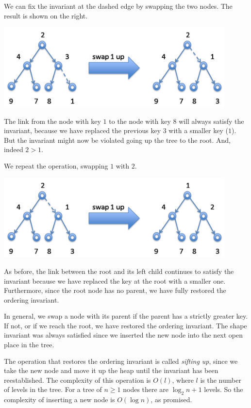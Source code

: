 We can fix the invariant at the dashed edge by swapping the two
nodes.  The result is shown on the right.
\begin{center}
  \includegraphics[width=0.9\textwidth]{img/swap1up-a.png}
\end{center}
The link from the node with key $1$ to the node with key $8$ will
always satisfy the invariant, because we have replaced the previous
key $3$ with a smaller key ($1$).  But the invariant might now be
violated going up the tree to the root.  And, indeed $2 > 1$.

We repeat the operation, swapping $1$ with $2$.
\begin{center}
  \includegraphics[width=0.9\textwidth]{img/swap1up-b.png}
\end{center}
As before, the link between the root and its left child continues to
satisfy the invariant because we have replaced the key at the root with
a smaller one.  Furthermore, since the root node has no parent, we
have fully restored the ordering invariant.

In general, we swap a node with its parent if the parent has a
strictly greater key.  If not, or if we reach the root, we have
restored the ordering invariant.  The shape invariant was always
satisfied since we inserted the new node into the next open place in
the tree.

The operation that restores the ordering invariant is called \emph{sifting
  up}, since we take the new node and move it up the heap until the invariant
has been reestablished.  The complexity of this operation is $O(l)$, where $l$
is the number of levels in the tree.  For a tree of $n \geq 1$ nodes there are
$\log_2 n +1$ levels.  So the complexity of inserting a new node is $O(\log n)$,
as promised.

